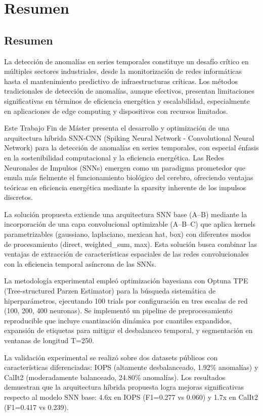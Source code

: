 \chapter{Resumen}

\section{Resumen}

La detección de anomalías en series temporales constituye un desafío crítico en múltiples sectores industriales, desde la monitorización de redes informáticas hasta el mantenimiento predictivo de infraestructuras críticas. Los métodos tradicionales de detección de anomalías, aunque efectivos, presentan limitaciones significativas en términos de eficiencia energética y escalabilidad, especialmente en aplicaciones de edge computing y dispositivos con recursos limitados.

Este Trabajo Fin de Máster presenta el desarrollo y optimización de una arquitectura híbrida SNN-CNN (Spiking Neural Network - Convolutional Neural Network) para la detección de anomalías en series temporales, con especial énfasis en la sostenibilidad computacional y la eficiencia energética. Las Redes Neuronales de Impulsos (SNNs) emergen como un paradigma prometedor que emula más fielmente el funcionamiento biológico del cerebro, ofreciendo ventajas teóricas en eficiencia energética mediante la sparsity inherente de los impulsos discretos.

La solución propuesta extiende una arquitectura SNN base (A--B) mediante la incorporación de una capa convolucional optimizable (A--B--C) que aplica kernels parametrizables (gaussiano, laplaciano, mexican hat, box) con diferentes modos de procesamiento (direct, weighted\_sum, max). Esta solución busca combinar las ventajas de extracción de características espaciales de las redes convolucionales con la eficiencia temporal asíncrona de las SNNs.

La metodología experimental empleó optimización bayesiana con Optuna TPE (Tree-structured Parzen Estimator) para la búsqueda sistemática de hiperparámetros, ejecutando 100 trials por configuración en tres escalas de red (100, 200, 400 neuronas). Se implementó un pipeline de preprocesamiento reproducible que incluye cuantización dinámica por cuantiles expandidos, expansión de etiquetas para mitigar el desbalanceo temporal, y segmentación en ventanas de longitud T=250.

La validación experimental se realizó sobre dos datasets públicos con características diferenciadas: IOPS (altamente desbalanceado, 1.92\% anomalías) y CalIt2 (moderadamente balanceado, 24.80\% anomalías). Los resultados demuestran que la arquitectura híbrida propuesta logra mejoras significativas respecto al modelo SNN base: 4.6x en IOPS (F1=0.277 vs 0.060) y 1.7x en CalIt2 (F1=0.417 vs 0.239).

